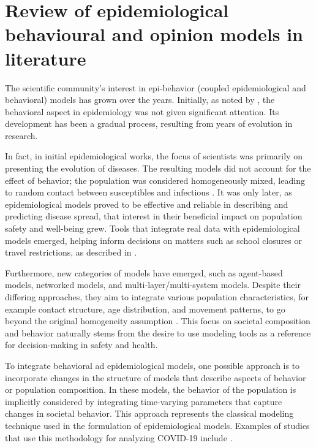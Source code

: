 
\chapter{Review of epidemiological behavioural and opinion models in literature}
\label{ch:literature_review}
The scientific community's interest in epi-behavior (coupled epidemiological and behavioral) models has grown over the years. Initially, as noted by \cite{Bauch_2012_overview}, the behavioral aspect in epidemiology was not given significant attention. Its development has been a gradual process, resulting from years of evolution in research.

In fact, in initial epidemiological  works, the focus of scientists was primarily on presenting the evolution of diseases. The resulting models did not account for the effect of behavior; the population was considered homogeneously mixed, leading to random contact between susceptibles and infectious \cite{Hernandez_Vargas_2022, Mata2021}. 
It was only later, as epidemiological models proved to be effective and reliable in describing and predicting disease spread, that interest in their beneficial impact on population safety and well-being grew. Tools that integrate real data with epidemiological models emerged, helping inform decisions on matters such as school closures or travel restrictions, as described in \cite{Bauch_2012_overview}.

Furthermore, new categories of models have emerged, such as agent-based models, networked models, and multi-layer/multi-system models. Despite their differing approaches, they aim to integrate various population characteristics, for example contact structure, age distribution, and movement patterns, to go beyond the original homogeneity assumption \cite{brauer2012mathematical}.
This focus on societal composition and behavior naturally stems from the desire to use modeling tools as a reference for decision-making in safety and health. 

To integrate behavioral ad epidemiological models, one possible approach is to incorporate changes in the structure of models that describe aspects of behavior or population composition. In these models, the behavior of the population is implicitly considered by integrating time-varying parameters that capture changes in societal behavior. This approach represents the classical modeling technique used in the formulation of epidemiological models. Examples of studies that use this methodology for analyzing COVID-19 include \cite{Giordano_2020, Dehning_2020, Proverbio_2021}.

